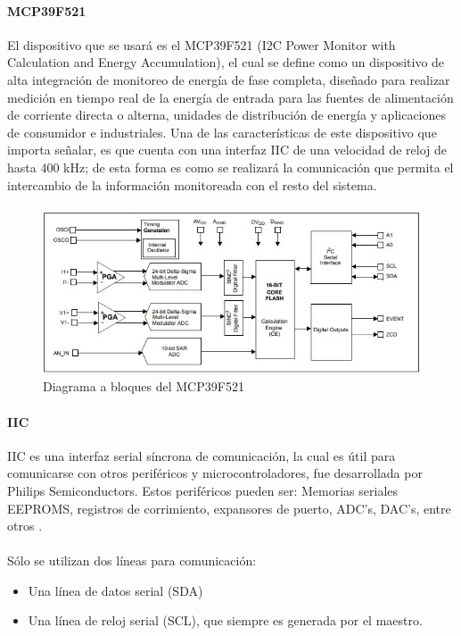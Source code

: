 \paragraph{MCP39F521}
El dispositivo que se usará es el MCP39F521 (I2C Power Monitor with Calculation and Energy Accumulation), el cual se define como un dispositivo de alta integración de monitoreo de energía de fase completa, diseñado para realizar medición en tiempo real de la energía de entrada para las fuentes de alimentación de corriente directa o alterna, unidades de distribución de energía y aplicaciones de consumidor e industriales. Una de las características de este dispositivo que importa señalar, es que cuenta con una interfaz IIC de una velocidad de reloj de hasta 400 kHz\citep{MarcoTeorico13}; de esta forma es como se realizará la comunicación que permita el intercambio de la información monitoreada con el resto del sistema. 
\paragraph{}
\begin{figure}[H]
	\centering
	\includegraphics[scale=.9]{Capitulo2/images/DiagramaDispMonitoreo.JPG}
	\caption{Diagrama a bloques del MCP39F521}
	\label{fig:diagrama_dispMonitoreo}
\end{figure}

\paragraph{IIC}
IIC es una interfaz serial síncrona de comunicación, la cual es útil para comunicarse  con otros periféricos y microcontroladores, fue desarrollada por Philips Semiconductors.
Estos periféricos pueden ser: Memorias seriales EEPROMS, registros de corrimiento, expansores de puerto, ADC's, DAC's, entre otros \citep{MarcoTeorico17}.
\paragraph{}
Sólo se utilizan dos líneas para comunicación:
\begin{itemize}
	\item Una línea de datos serial (SDA)
    \item Una línea de reloj serial (SCL), que siempre es generada por el maestro.
\end{itemize}

